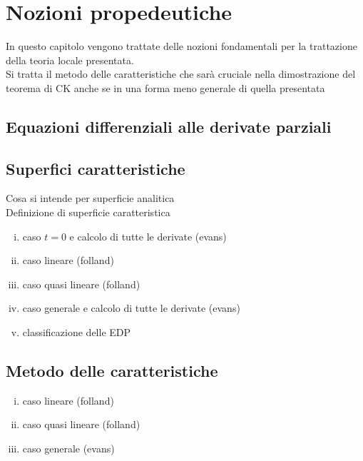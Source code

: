 \chapter{Nozioni propedeutiche}
In questo capitolo vengono trattate delle nozioni fondamentali per la trattazione della teoria locale presentata.\\
Si tratta il metodo delle caratteristiche che sarà cruciale nella dimostrazione del teorema di CK anche se in una forma meno generale di quella presentata

\section{Equazioni differenziali alle derivate parziali}
\section{Superfici caratteristiche}
Cosa si intende per superficie analitica\\
Definizione di superficie caratteristica

\begin{enumerate}[i.]
\item
caso $t=0$ e calcolo di tutte le derivate (evans)
\item
caso lineare (folland)
\item
caso quasi lineare (folland)
\item
caso generale e calcolo di tutte le derivate (evans)
\item 
classificazione delle EDP
\end{enumerate}


\section{Metodo delle caratteristiche}

\begin{enumerate}[i.]
\item
caso lineare (folland)
\item
caso quasi lineare (folland)
\item
caso generale (evans)
\end{enumerate}